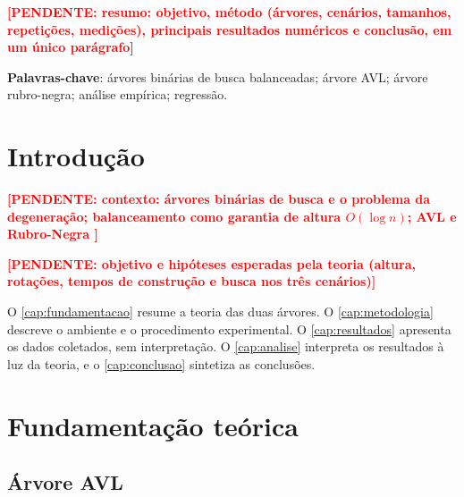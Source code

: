 \documentclass[
    12pt,
    oneside,
    a4paper,
    openany,
    chapter=TITLE,
    english,
    brazil
]{abntex2}
\newcommand{\pendente}[1]{\textcolor{red}{\textbf{[PENDENTE: #1]}}}
\begin{document}
\frenchspacing

\pretextual

\imprimircapa
\imprimirfolhaderosto

\setlength{\absparsep}{18pt}
\begin{resumo}
\pendente{resumo: objetivo, método (árvores, cenários, tamanhos, repetições, medições), principais resultados numéricos e conclusão, em um único parágrafo}

\textbf{Palavras-chave}: árvores binárias de busca balanceadas; árvore AVL; árvore rubro-negra; análise empírica; regressão.
\end{resumo}

\listoffigures*
\cleardoublepage

\listoftables*
\cleardoublepage

\tableofcontents*
\cleardoublepage

\textual

\chapter{Introdução}
\label{cap:introducao}

\pendente{contexto: árvores binárias de busca e o problema da degeneração; balanceamento como garantia de altura $O(\log n)$; AVL \cite{adelson1962} e Rubro-Negra \cite{bayer1972,guibas1978,cormen2012}}

\pendente{objetivo e hipóteses esperadas pela teoria (altura, rotações, tempos de construção e busca nos três cenários)}

O \autoref{cap:fundamentacao} resume a teoria das duas árvores. O \autoref{cap:metodologia} descreve o ambiente e o procedimento experimental. O \autoref{cap:resultados} apresenta os dados coletados, sem interpretação. O \autoref{cap:analise} interpreta os resultados à luz da teoria, e o \autoref{cap:conclusao} sintetiza as conclusões.

\chapter{Fundamentação teórica}
\label{cap:fundamentacao}

\section{Árvore AVL}
\label{sec:avl}
\end{document}
